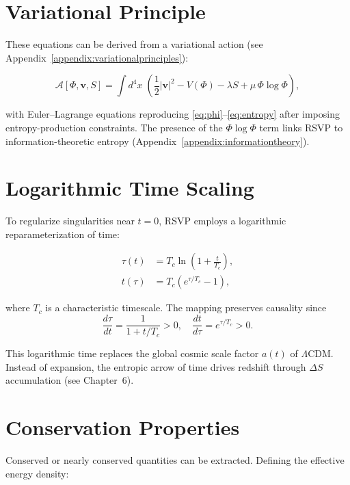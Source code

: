 \documentclass[12pt]{report}
\begin{document}
\section{Variational Principle}

These equations can be derived from a variational action (see Appendix~\ref{appendix:variationalprinciples}):

\begin{equation}
\mathcal{A}[\Phi,\mathbf{v},S] = \int d^4x \; \left(
\frac{1}{2}|\mathbf{v}|^2 - V(\Phi) - \lambda S + \mu \, \Phi \log \Phi
\right),
\label{eq:action}
\end{equation}

with Euler–Lagrange equations reproducing \eqref{eq:phi}--\eqref{eq:entropy} after imposing entropy-production constraints. The presence of the $\Phi \log \Phi$ term links RSVP to information-theoretic entropy (Appendix~\ref{appendix:informationtheory}).

\section{Logarithmic Time Scaling}

To regularize singularities near $t=0$, RSVP employs a logarithmic reparameterization of time:

\begin{align}
\tau(t) &= T_c \ln\!\left(1+\frac{t}{T_c}\right), \label{eq:logtime1}\\
t(\tau) &= T_c \left(e^{\tau/T_c} - 1\right), \label{eq:logtime2}
\end{align}

where $T_c$ is a characteristic timescale. The mapping preserves causality since
\begin{equation}
\frac{d\tau}{dt} = \frac{1}{1+t/T_c} > 0, 
\quad
\frac{dt}{d\tau} = e^{\tau/T_c} > 0.
\end{equation}

This logarithmic time replaces the global cosmic scale factor $a(t)$ of $\Lambda$CDM. Instead of expansion, the entropic arrow of time drives redshift through $\Delta S$ accumulation (see Chapter~6).

\section{Conservation Properties}

Conserved or nearly conserved quantities can be extracted. Defining the effective energy density:
\end{document}
